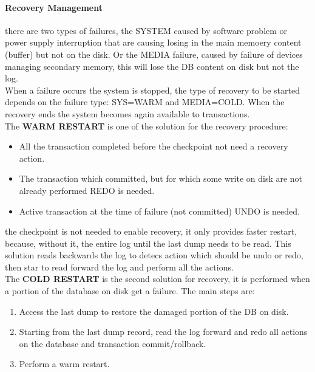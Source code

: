 \documentclass[12pt]{article}
\begin{document}
\paragraph{Recovery Management} there are two types of failures, the SYSTEM caused by software problem or power supply interruption that are causing losing in the main memoery content (buffer) but not on the disk. Or the MEDIA failure, caused by failure of devices managing secondary memory, this will lose the DB content on disk but not the log.\\
When a failure occurs the system is stopped, the type of recovery to be started depends on the failure type: SYS=WARM and MEDIA=COLD. When the recovery ends the system becomes again available to transactions.\\
The \textbf{WARM RESTART} is one of the solution for the recovery procedure:
\begin{itemize}
  \item All the transaction completed before the checkpoint not need a recovery action.
  \item The transaction which committed, but for which some write on disk are not already performed REDO is needed.
  \item Active transaction at the time of failure (not committed) UNDO is needed.
\end{itemize}
the checkpoint is not needed to enable recovery, it only provides faster restart, because, without it, the entire log until the last dump needs to be read. This solution reads backwards the log to detecs action which should be undo or redo, then star to read forward the log and perform all the actions.\\
The \textbf{COLD RESTART} is the second solution for recovery, it is performed when a portion of the database on disk get a failure. The main steps are:
\begin{enumerate}
  \item Access the last dump to restore the damaged portion of the DB on disk.
  \item Starting from the last dump record, read the log forward and redo all actions on the database and transaction commit/rollback.
  \item Perform a warm restart.
\end{enumerate}
\end{document}
